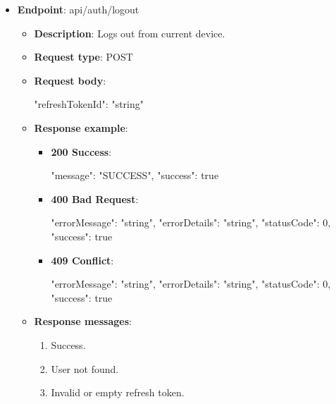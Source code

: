 \begin{itemize}
    \item \textbf{Endpoint}: api/auth/logout
    \begin{itemize}
        \item \textbf{Description}: Logs out from current device.
        \item \textbf{Request type}: POST
        \item \textbf{Request body}:
        \begin{spverbatim}
        {
            "refreshTokenId": "string"
        }
        \end{spverbatim}
        \item \textbf{Response example}:
        \begin{itemize}
            \item \textbf{200 Success}:
            \begin{spverbatim}
            {
                "message": "SUCCESS",
                "success": true
            }
            \end{spverbatim}
            \item \textbf{400 Bad Request}:
            \begin{spverbatim}
            {
                "errorMessage": "string",
                "errorDetails": "string",
                "statusCode": 0,
                "success": true
            }
            \end{spverbatim}
            \item \textbf{409 Conflict}:
            \begin{spverbatim}
            {
                "errorMessage": "string",
                "errorDetails": "string",
                "statusCode": 0,
                "success": true
            }
            \end{spverbatim}
        \end{itemize}
        \item \textbf{Response messages}:
        \begin{enumerate}
            \item Success.
            \item User not found.
            \item Invalid or empty refresh token.
        \end{enumerate}
    \end{itemize}


\end{itemize}
